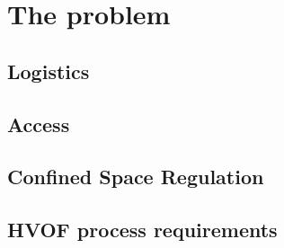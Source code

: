 \section{The problem}



\subsection{Logistics}

\subsection{Access}

\subsection{Confined Space Regulation}

\subsection{HVOF process requirements}
